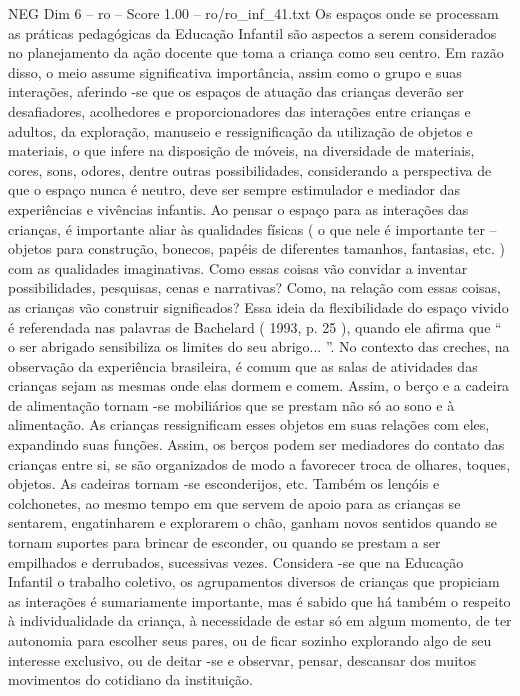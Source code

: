 \begin{textsample}{NEG Dim 6 – ro – Score 1.00 – ro/ro\_inf\_41.txt}
Os espaços onde se processam as práticas pedagógicas da Educação Infantil são aspectos a serem considerados no planejamento da ação docente que toma a criança como seu centro.
Em razão disso, o meio assume significativa importância, assim como o grupo e suas interações, aferindo -se que os espaços de atuação das crianças deverão ser desafiadores, acolhedores e proporcionadores das interações entre crianças e adultos, da exploração, manuseio e ressignificação da utilização de objetos e materiais, o que infere na disposição de móveis, na diversidade de materiais, cores, sons, odores, dentre outras possibilidades, considerando a perspectiva de que o espaço nunca é neutro, deve ser sempre estimulador e mediador das experiências e vivências infantis.
Ao pensar o espaço para as interações das crianças, é importante aliar às qualidades físicas ( o que nele é importante ter – objetos para construção, bonecos, papéis de diferentes tamanhos, fantasias, etc. ) com as qualidades imaginativas.
Como essas coisas vão convidar a inventar possibilidades, pesquisas, cenas e narrativas?
Como, na relação com essas coisas, as crianças vão construir significados?
Essa ideia da flexibilidade do espaço vivido é referendada nas palavras de Bachelard ( 1993, p. 25 ), quando ele afirma que “ o ser abrigado sensibiliza os limites do seu abrigo... ”.
No contexto das creches, na observação da experiência brasileira, é comum que as salas de atividades das crianças sejam as mesmas onde elas dormem e comem.
Assim, o berço e a cadeira de alimentação tornam -se mobiliários que se prestam não só ao sono e à alimentação.
As crianças ressignificam esses objetos em suas relações com eles, expandindo suas funções.
Assim, os berços podem ser mediadores do contato das crianças entre si, se são organizados de modo a favorecer troca de olhares, toques, objetos.
As cadeiras tornam -se esconderijos, etc.
Também os lençóis e colchonetes, ao mesmo tempo em que servem de apoio para as crianças se sentarem, engatinharem e explorarem o chão, ganham novos sentidos quando se tornam suportes para brincar de esconder, ou quando se prestam a ser empilhados e derrubados, sucessivas vezes.
Considera -se que na Educação Infantil o trabalho coletivo, os agrupamentos diversos de crianças que propiciam as interações é sumariamente importante, mas é sabido que há também o respeito à individualidade da criança, à necessidade de estar só em algum momento, de ter autonomia para escolher seus pares, ou de ficar sozinho explorando algo de seu interesse exclusivo, ou de deitar -se e observar, pensar, descansar dos muitos movimentos do cotidiano da instituição.

\end{textsample}
